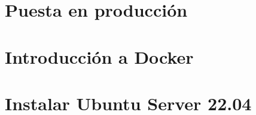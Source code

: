 \documentclass{\ClassPath/yukibook}
\begin{document}
    \part{Puesta en producción}
    

    \part{Introducción a Docker}
    \graphicspath{{../../otros/Docker/}}
    

    \part{Instalar Ubuntu  Server 22.04}
    \graphicspath{{../../anexos/instalar_ubuntu_lts/img/}}
    

    \graphicspath{{../../temas_comunes/administracion_remota/img/}}
    
\end{document}
